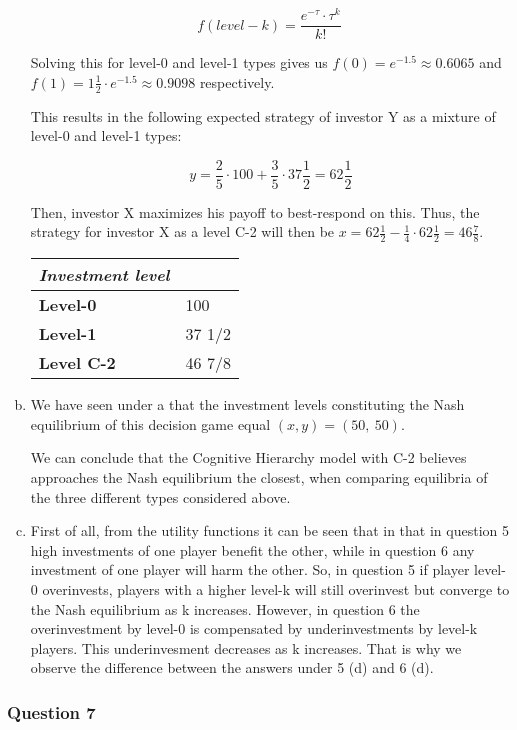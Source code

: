 \documentclass[a4paper]{article}
\begin{document}
\begin{enumerate}[(a)]
\[f\left( level - k \right) = \frac{e^{- \tau} \cdot \tau^{k}}{k!}\ \]

Solving this for level-0 and level-1 types gives us
\(f\left( 0 \right) = e^{- 1.5} \approx 0.6065\) and
\(f\left( 1 \right) = 1\frac{1}{2} \cdot e^{- 1.5} \approx 0.9098\)
respectively.

This results in the following expected strategy of investor Y as a
mixture of level-0 and level-1 types:

\[y = \frac{2}{5} \cdot 100 + \frac{3}{5} \cdot 37\frac{1}{2} = 62\frac{1}{2}\]

Then, investor X maximizes his payoff to best-respond on this. Thus, the
strategy for investor X as a level C-2 will then be
\(x = 62\frac{1}{2} - \frac{1}{4} \cdot 62\frac{1}{2} = 46\frac{7}{8}\).

\begin{longtable}[]{@{}ll@{}}
\toprule
\emph{Investment level }\tabularnewline
\midrule

\textbf{Level-0} & 100\tabularnewline
\textbf{Level-1} & 37 1/2\tabularnewline
\textbf{Level C-2} & 46 7/8\tabularnewline
\bottomrule
\end{longtable}


\item
We have seen under a that the investment levels constituting the Nash
equilibrium of this decision game equal
\(\left( x,y \right) = (50,\ 50)\).

We can conclude that the Cognitive Hierarchy model with C-2 believes
approaches the Nash equilibrium the closest, when comparing equilibria
of the three different types considered above.

\item
First of all, from the utility functions it can be seen that in that in question 5 high investments of one player benefit the other, while in question 6 any investment of one player will harm the other. So, in question 5 if player level-0 overinvests, players with a higher level-k will still overinvest but converge to the Nash equilibrium as k increases. However, in question 6 the overinvestment by level-0 is compensated by underinvestments by level-k players. This underinvesment decreases as k increases. That is why we observe the difference between the answers under 5 (d) and 6 (d).


\end{enumerate}

\subsubsection{Question 7}
\end{document}
